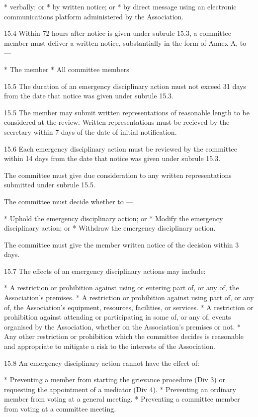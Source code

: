 \documentclass[../constitution.tex]{subfiles}
\begin{document}
* verbally; or
* by written notice; or
* by direct message using an electronic communications platform administered by the Association.

15.4 Within 72 hours after notice is given under subrule 15.3, a committee member must deliver a written notice, substantially in the form of Annex A, to ---

* The member
* All committee members

15.5 The duration of an emergency disciplinary action must not exceed 31 days from the date that notice was given under subrule 15.3.

15.5 The member may submit written representations of reasonable length to be considered at the review. Written representations must be recieved by the secretary within 7 days of the date of initial notification.

15.6 Each emergency disciplinary action must be reviewed by the committee within 14 days from the date that notice was given under subrule 15.3. 

The committee must give due consideration to any written representations submitted under subrule 15.5.

The committee must decide whether to ---

* Uphold the emergency disciplinary action; or
* Modify the emergency disciplinary action; or
* Withdraw the emergency disciplinary action.

The committee must give the member written notice of the decision within 3 days.

15.7 The effects of an emergency disciplinary actions may include:

* A restriction or prohibition against using or entering part of, or any of, the Association's premises.
* A restriction or prohibition against using part of, or any of, the Association's equipment, resources, facilities, or services.
* A restriction or prohibition against attending or participating in some of, or any of, events organised by the Association, whether on the Association's premises or not.
* Any other restriction or prohibition which the committee decides is reasonable and appropriate to mitigate a risk to the interests of the Association.

15.8 An emergency disciplinary action cannot have the effect of:

* Preventing a member from starting the grievance procedure (Div 3) or requesting the appointment of a mediator (Div 4).
* Preventing an ordinary member from voting at a general meeting.
* Preventing a committee member from voting at a committee meeting.
\end{document}
